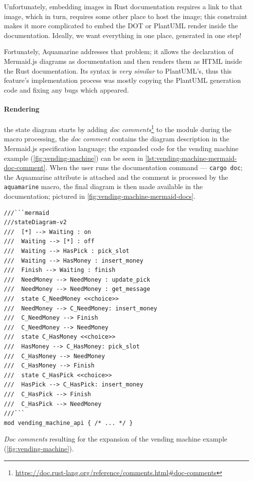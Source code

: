 Unfortunately, embedding images in Rust documentation requires a link to that image, which in turn, requires some other place to host the image;
this constraint makes it more complicated to embed the DOT or PlantUML render inside the documentation.
Ideally, we want everything in one place, generated in one step!

Fortunately, Aquamarine addresses that problem;
it allows the declaration of Mermaid.js diagrams as documentation and then renders them as HTML inside the Rust documentation.
Its syntax is \emph{very similar} to PlantUML's,
thus this feature's implementation process was mostly copying the PlantUML generation code and fixing any bugs which appeared.

\paragraph{Rendering} the state diagram starts by adding \emph{doc comments}\footnote{\url{https://doc.rust-lang.org/reference/comments.html\#doc-comments}}
to the module during the macro processing, the \emph{doc comment} contains the diagram description in the Mermaid.js specification language;
the expanded code for the vending machine example (\autoref{fig:vending-machine}) can be seen in \autoref{lst:vending-machine-mermaid-doc-comment}.
When the user runs the documentation command --- \texttt{cargo doc}; the Aquamarine attribute is attached and
the comment is processed by the \texttt{aquamarine} macro, the final diagram is then made available in the documentation;
pictured in \autoref{fig:vending-machine-mermaid-docs}.

\begin{listing}
    \begin{verbatim}
///```mermaid
///stateDiagram-v2
///  [*] --> Waiting : on
///  Waiting --> [*] : off
///  Waiting --> HasPick : pick_slot
///  Waiting --> HasMoney : insert_money
///  Finish --> Waiting : finish
///  NeedMoney --> NeedMoney : update_pick
///  NeedMoney --> NeedMoney : get_message
///  state C_NeedMoney <<choice>>
///  NeedMoney --> C_NeedMoney: insert_money
///  C_NeedMoney --> Finish
///  C_NeedMoney --> NeedMoney
///  state C_HasMoney <<choice>>
///  HasMoney --> C_HasMoney: pick_slot
///  C_HasMoney --> NeedMoney
///  C_HasMoney --> Finish
///  state C_HasPick <<choice>>
///  HasPick --> C_HasPick: insert_money
///  C_HasPick --> Finish
///  C_HasPick --> NeedMoney
///```
mod vending_machine_api { /* ... */ }
    \end{verbatim}
    \caption{\emph{Doc comments} resulting for the expansion of the vending machine example (\autoref{fig:vending-machine}).}
    \label{lst:vending-machine-mermaid-doc-comment}
\end{listing}

